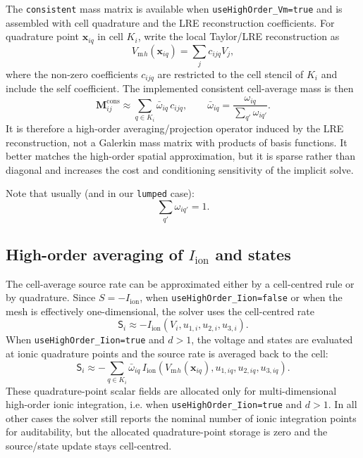 \documentclass[11pt,a4paper]{article}
\newcommand{\code}[1]{\texttt{\small #1}}
\newcommand{\Vm}{V_{\text{m}}}
\newcommand{\Iion}{I_{\mathrm{ion}}}
\newcommand{\Mmass}{\mathbf{M}}
\begin{document}
The \code{consistent} mass matrix is available when \code{useHighOrder\_Vm=true}
and is assembled with cell quadrature and the LRE reconstruction coefficients.
For quadrature point $\mathbf{x}_{iq}$ in cell $K_i$, write the local Taylor/LRE
reconstruction as
\begin{equation}
  \Vm{}_{h}(\mathbf{x}_{iq})
  =
  \sum_j c_{ijq} V_j ,
\end{equation}
where the non-zero coefficients $c_{ijq}$ are restricted to the cell stencil
of $K_i$ and include the self coefficient. The implemented consistent
cell-average mass is then
\begin{equation}
  \Mmass^{\mathrm{cons}}_{ij}
  \approx
  \sum_{q\in K_i}
  \bar{\omega}_{iq}\,c_{ijq},
  \qquad
  \bar{\omega}_{iq}
  =
  \frac{\omega_{iq}}{\sum_{q'}\omega_{iq'}}.
  \label{eq:consistent}
\end{equation}
It is therefore a high-order averaging/projection operator induced by the LRE
reconstruction, not a Galerkin mass matrix with products of basis functions.
It better matches the high-order spatial approximation, but it is sparse
rather than diagonal and increases the cost and conditioning sensitivity of
the implicit solve.

Note that usually (and in our \code{lumped} case):
\begin{equation}
\sum_{q'}\omega_{iq'}=1.
\end{equation}

\subsection{High-order averaging of \texorpdfstring{$\Iion$}{Iion} and states}
\label{sec:iion-quad}

The cell-average source rate can be approximated either by a cell-centred rule
or by quadrature. Since $S=-\Iion$, when \code{useHighOrder\_Iion=false} or
when the mesh is effectively one-dimensional, the solver uses the
cell-centred rate
\begin{equation}
  \mathsf{S}_i
  \approx
  -\Iion(V_i,u_{1,i},u_{2,i},u_{3,i}).
\end{equation}
When \code{useHighOrder\_Iion=true} and $d>1$, the voltage and states are
evaluated at ionic quadrature points and the source rate is averaged back to
the cell:
\begin{equation}
  \mathsf{S}_i
  \approx
  -\sum_{q\in K_i}\bar{\omega}_{iq}\,
  \Iion
  \left(
    \Vm{}_{h}(\mathbf{x}_{iq}),
    u_{1,iq},
    u_{2,iq},
    u_{3,iq}
  \right).
  \label{eq:iion-quadrature}
\end{equation}
These quadrature-point scalar fields are allocated only for multi-dimensional
high-order ionic integration, i.e. when \code{useHighOrder\_Iion=true} and
$d>1$. In all other cases the solver still reports the nominal number of ionic
integration points for auditability, but the allocated quadrature-point storage
is zero and the source/state update stays cell-centred.
\end{document}
